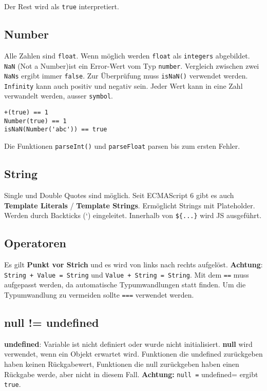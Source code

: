 \documentclass[11pt,twoside,landscape]{article}
\begin{document}
\begin{multicols}{4}
Der Rest wird als \texttt{true}  interpretiert.

\subsection*{Number}
\label{sec:org486a7af}
Alle Zahlen sind \texttt{float}. Wenn möglich werden \texttt{float} als \texttt{integers} abgebildet. \texttt{NaN} (Not a Number)ist ein Error-Wert vom Typ \texttt{number}. Vergleich zwischen zwei \texttt{NaNs} ergibt immer \texttt{false}. Zur Überprüfung muss \texttt{isNaN()} verwendet werden. \texttt{Infinity} kann auch positiv und negativ sein. Jeder Wert kann in eine Zahl verwandelt werden, ausser \texttt{symbol}.
\begin{verbatim}
+(true) == 1
Number(true) == 1
isNaN(Number('abc')) == true
\end{verbatim}

Die Funktionen \texttt{parseInt()} und \texttt{parseFloat} parsen bis zum ersten Fehler.


\subsection*{String}
\label{sec:org27c7926}
Single und Double Quotes sind möglich. Seit ECMAScript 6 gibt es auch \textbf{Template Literals} / \textbf{Template Strings}. Ermöglicht Strings mit Plateholder. Werden durch Backticks (`) eingeleitet. Innerhalb von \texttt{\$\{...\}} wird JS ausgeführt.

\subsection*{Operatoren}
\label{sec:orgbeddc6c}
Es gilt \textbf{Punkt vor Strich} und es wird von links nach rechts aufgelöst. \textbf{Achtung}: \texttt{String + Value = String} und \texttt{Value + String = String}.
Mit dem \texttt{==} muss aufgepasst werden, da automatische Typumwandlungen statt finden. Um die Typumwandlung zu vermeiden sollte \texttt{===} verwendet werden.

\subsection*{null != undefined}
\label{sec:org1d65242}
\textbf{undefined}: Variable ist nicht definiert oder wurde nicht initialisiert. \textbf{null} wird verwendet, wenn ein Objekt erwartet wird. Funktionen die undefined zurückgeben haben keinen Rückgabewert, Funktionen die null zurückgeben haben einen Rückgabe werde, aber nicht in diesem Fall. \textbf{Achtung:} \texttt{null =} undefined= ergibt \texttt{true}.


\end{multicols}
\end{document}
